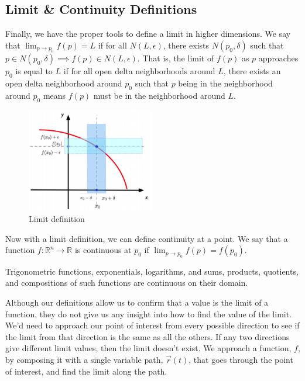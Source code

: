 \subsection{Limit \& Continuity Definitions}
\noindent
Finally, we have the proper tools to define a limit in higher dimensions.
We say that $\lim_{p\to p_0}{f(p)} = L$ if for all $N(L, \epsilon)$, there exists $N(p_0,\delta)$ such that $p \in N(p_0, \delta) \implies f(p) \in N(L, \epsilon)$.
That is, the limit of $f(p)$ as $p$ approaches $p_0$ is equal to $L$ if for all open delta neighborhoods around $L$, there exists an open delta neighborhood around $p_0$ such that $p$ being in the neighborhood around $p_0$ means $f(p)$ must be in the neighborhood around $L$.

\begin{figure}[H]
	\centering
	\includegraphics[width=0.5\textwidth]{./Images/differentialMultivariableCalculus/limit.png}
	\caption{Limit definition}
\end{figure}

\noindent
Now with a limit definition, we can define continuity at a point.
We say that a function $f : \mathbb{R}^n \to \mathbb{R}$ is continuous at $p_0$ if $\lim_{p \to p_0}{f(p)} = f(p_0)$.\\

\noindent
\begin{theorem}
	Trigonometric functions, exponentials, logarithms, and sums, products, quotients, and compositions of such functions are continuous on their domain.
\end{theorem}

\noindent
Although our definitions allow us to confirm that a value is the limit of a function, they do not give us any insight into how to find the value of the limit.
We'd need to approach our point of interest from every possible direction to see if the limit from that direction is the same as all the others.
If any two directions give different limit values, then the limit doesn't exist.
We approach a function, $f$, by composing it with a single variable path, $\vec{r}(t)$, that goes through the point of interest, and find the limit along the path.\\

